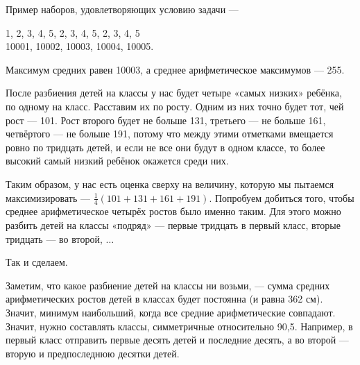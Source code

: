 
\begin{itemize}
\itA Пример наборов, удовлетворяющих условию задачи —

1, 2, 3, 4, 5\scolon{}, 2, 3, 4, 5\scolon{}, 2, 3, 4, 5\scolon\quad\\
10001, 10002, 10003, 10004, 10005.

Максимум средних равен 10003, а среднее арифметическое максимумов — 255.

\itB После разбиения детей на классы у нас будет четыре «самых низких» ребёнка, по одному на класс. Расставим их по росту. Одним из них точно будет тот, чей рост — \SI{101}{}. Рост второго будет не больше 131, третьего — не больше 161, четвёртого — не больше 191, потому что между этими отметками вмещается ровно по тридцать детей, и если не все они будут в одном классе, то более высокий самый низкий ребёнок окажется среди них.

Таким образом, у нас есть оценка сверху на величину, которую мы пытаемся максимизировать — $\tfrac{1}{4}(101+131+161+191)$. Попробуем добиться того, чтобы среднее арифметическое четырёх ростов было именно таким. Для этого можно разбить детей на классы «подряд» — первые тридцать в первый класс, вторые тридцать — во второй, $\ldots$

Так и сделаем.

\itC Заметим, что какое разбиение детей на классы ни возьми, — сумма средних арифметических ростов детей в классах будет постоянна (и равна 362 см). Значит, минимум наибольший, когда все средние арифметические совпадают. Значит, нужно составлять классы, симметричные относительно 90,5. Например, в первый класс отправить первые десять детей и последние десять, а во второй — вторую и предпоследнюю десятки детей.
\end{itemize}